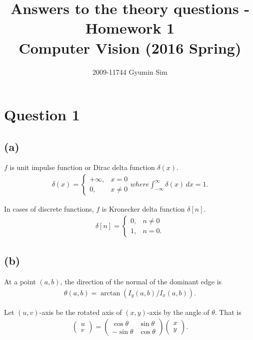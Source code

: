 \documentclass[a4paper,10pt]{article}
\begin{document}
\title{Answers to the theory questions - Homework 1 \\
  \large Computer Vision (2016 Spring)}
\author{2009-11744 Gyumin Sim}
\maketitle

\section*{Question 1}

\subsection*{(a)}

$f$ is unit impulse function or Dirac delta function $\delta(x)$.
\begin{align*}
\delta(x) = \begin{cases} +\infty, & x = 0 \\ 0, & x \ne 0 \end{cases} where \int_{-\infty}^\infty \delta(x) \, dx = 1.
\end{align*}

In cases of discrete functions, $f$ is Kronecker delta function $\delta[n]$.
\begin{align*}
\delta[n] = \begin{cases} 0, & n \ne 0 \\ 1, & n = 0.\end{cases}
\end{align*}

\subsection*{(b)}

At a point $(a, b)$, the direction of the normal of the dominant edge is
\begin{align*}
\theta(a, b) = \arctan(I_y(a, b) / I_x(a, b)).
\end{align*}

Let $(u, v)$-axis be the rotated axis of $(x, y)$-axis by the angle of $\theta$.
That is
\begin{align*}
\begin{pmatrix}
u \\
v
\end{pmatrix} =
\begin{pmatrix}
  \cos \theta & \sin \theta \\
- \sin \theta & \cos \theta
\end{pmatrix}
\begin{pmatrix}
x \\
y
\end{pmatrix}.
\end{align*}
\end{document}
